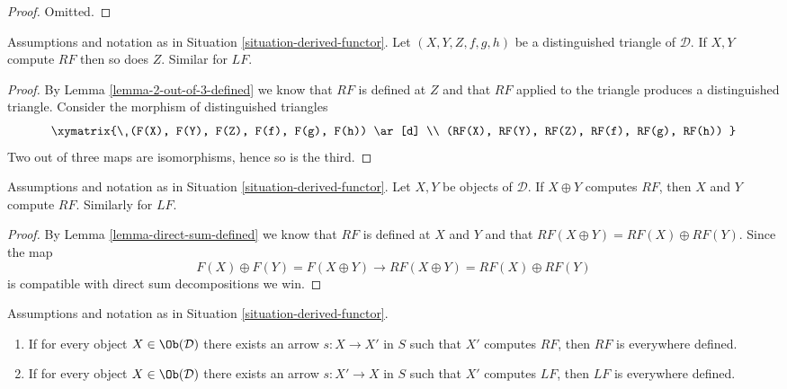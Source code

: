 \begin{proof}
Omitted.
\end{proof}

\begin{lemma}
\label{lemma-2-out-of-3-computes}
Assumptions and notation as in
Situation \ref{situation-derived-functor}.
Let $(X, Y, Z, f, g, h)$ be a distinguished triangle of $\mathcal{D}$.
If $X, Y$ compute $RF$ then so does $Z$. Similar for $LF$.
\end{lemma}

\begin{proof}
By
Lemma \ref{lemma-2-out-of-3-defined}
we know that $RF$ is defined at $Z$ and that $RF$ applied to the
triangle produces a distinguished triangle.
Consider the morphism of distinguished triangles
$$
\xymatrix{\
(F(X), F(Y), F(Z), F(f), F(g), F(h)) \ar[d] \\
(RF(X), RF(Y), RF(Z), RF(f), RF(g), RF(h))
}
$$
Two out of three maps are isomorphisms, hence so is the third.
\end{proof}

\begin{lemma}
\label{lemma-direct-sum-computes}
Assumptions and notation as in
Situation \ref{situation-derived-functor}.
Let $X, Y$ be objects of $\mathcal{D}$.
If $X \oplus Y$ computes $RF$, then $X$ and $Y$ compute $RF$.
Similarly for $LF$.
\end{lemma}

\begin{proof}
By
Lemma \ref{lemma-direct-sum-defined}
we know that $RF$ is defined at $X$ and $Y$ and that
$RF(X \oplus Y) = RF(X) \oplus RF(Y)$.
Since the map
$$
F(X) \oplus F(Y) = F(X \oplus Y) \longrightarrow
RF(X \oplus Y) = RF(X) \oplus RF(Y)
$$
is compatible with direct sum decompositions we win.
\end{proof}

\begin{lemma}
\label{lemma-existence-computes}
Assumptions and notation as in
Situation \ref{situation-derived-functor}.
\begin{enumerate}
\item If for every object $X \in \Ob(\mathcal{D})$
there exists an arrow $s : X \to X'$ in $S$ such that $X'$ computes
$RF$, then $RF$ is everywhere defined.
\item If for every object $X \in \Ob(\mathcal{D})$
there exists an arrow $s : X' \to X$ in $S$ such that $X'$ computes
$LF$, then $LF$ is everywhere defined.
\end{enumerate}
\end{lemma}

